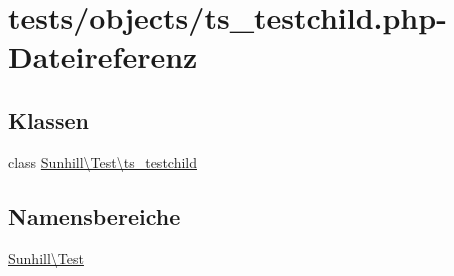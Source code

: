 \hypertarget{ts__testchild_8php}{}\section{tests/objects/ts\+\_\+testchild.php-\/\+Dateireferenz}
\label{ts__testchild_8php}
\subsection*{Klassen}
\begin{DoxyCompactItemize}
\item 
class \hyperlink{classSunhill_1_1Test_1_1ts__testchild}{Sunhill\textbackslash{}\+Test\textbackslash{}ts\+\_\+testchild}
\end{DoxyCompactItemize}
\subsection*{Namensbereiche}
\begin{DoxyCompactItemize}
\item 
 \hyperlink{namespaceSunhill_1_1Test}{Sunhill\textbackslash{}\+Test}
\end{DoxyCompactItemize}
